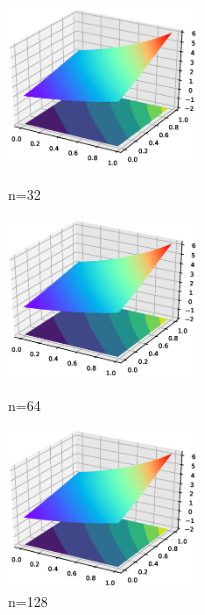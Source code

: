 \documentclass[12]{article}%
\begin{document}
\begin{figure}[H]
    \centering
    \begin{minipage}[t]{0.3\textwidth}
    \centering
    \includegraphics[width=5cm]{../pic/fun132.eps}
    \caption{n=32}
    \end{minipage}
    \begin{minipage}[t]{0.3\textwidth}
    \centering
    \includegraphics[width=5cm]{../pic/fun164.eps}
    \caption{n=64}
    \end{minipage}
    \begin{minipage}[t]{0.3\textwidth}
    \centering
    \includegraphics[width=5cm]{../pic/fun1128.eps}
    \caption{n=128}
    \end{minipage}
\end{figure}
    
\end{document}
